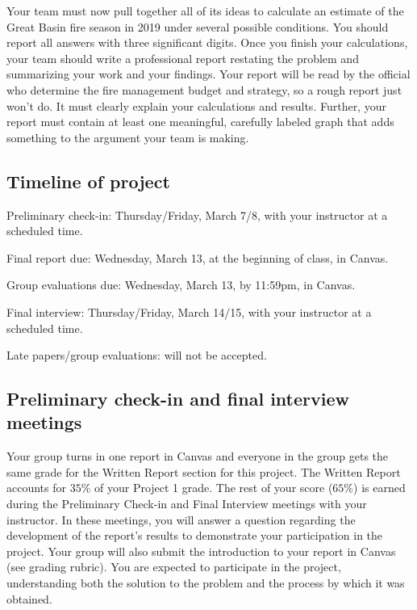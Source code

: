 \documentclass[11pt]{article}\usepackage[]{graphicx}\usepackage[]{color}
\begin{document}

    Your team must now pull together all of its ideas to calculate an estimate
    of the Great Basin fire season in 2019 under several possible conditions. You
    should report all answers with three significant digits. Once you finish
    your calculations, your team should write a professional report restating
    the problem and summarizing your work and your findings. Your report will be
    read by the official who determine the fire management budget and strategy, so
    a rough report just won't do. It must clearly explain your calculations and
    results. Further, your report must contain at least one
    meaningful, carefully labeled graph that adds something to the argument
    your team is making.


\subsection*{Timeline of project}

\begin{compactdesc}
    \item[Preliminary check-in:] Thursday/Friday, March 7/8, with your
    instructor at a scheduled time.
    \item[Final report due:] Wednesday, March 13, at the beginning of
    class, in Canvas.
    \item[Group evaluations due:] Wednesday, March 13, by 11:59pm, in
    Canvas.
    \item[Final interview:] Thursday/Friday, March 14/15, with your
    instructor at a scheduled time.
    \item[Late papers/group evaluations:] will not be accepted.
\end{compactdesc}

\subsection*{Preliminary check-in and final interview meetings}

Your group turns in one report in Canvas and everyone in the group gets the
same grade for the Written Report section for this project. The Written Report
accounts for $35\%$ of your Project 1 grade.  The rest of your score ($65\%$)
is earned during the Preliminary Check-in and Final Interview meetings with
your instructor. In these meetings, you will answer a question regarding the
development of the report's results to demonstrate your participation in the
project. Your group will also submit the introduction to your report in Canvas
(see grading rubric). You are expected to participate in the project,
understanding both the solution to the problem and the process by which it was
obtained.
\end{document}
